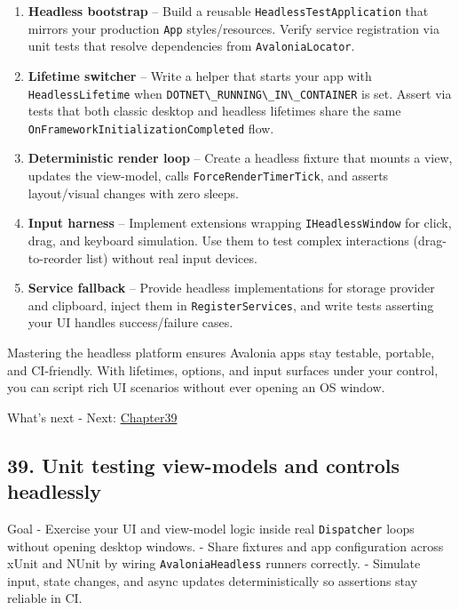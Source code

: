 \begin{enumerate}
\def\labelenumi{\arabic{enumi}.}
\tightlist
\item
  \textbf{Headless bootstrap} -- Build a reusable
  \passthrough{\lstinline!HeadlessTestApplication!} that mirrors your
  production \passthrough{\lstinline!App!} styles/resources. Verify
  service registration via unit tests that resolve dependencies from
  \passthrough{\lstinline!AvaloniaLocator!}.
\item
  \textbf{Lifetime switcher} -- Write a helper that starts your app with
  \passthrough{\lstinline!HeadlessLifetime!} when
  \passthrough{\lstinline!DOTNET\_RUNNING\_IN\_CONTAINER!} is set.
  Assert via tests that both classic desktop and headless lifetimes
  share the same
  \passthrough{\lstinline!OnFrameworkInitializationCompleted!} flow.
\item
  \textbf{Deterministic render loop} -- Create a headless fixture that
  mounts a view, updates the view-model, calls
  \passthrough{\lstinline!ForceRenderTimerTick!}, and asserts
  layout/visual changes with zero sleeps.
\item
  \textbf{Input harness} -- Implement extensions wrapping
  \passthrough{\lstinline!IHeadlessWindow!} for click, drag, and
  keyboard simulation. Use them to test complex interactions
  (drag-to-reorder list) without real input devices.
\item
  \textbf{Service fallback} -- Provide headless implementations for
  storage provider and clipboard, inject them in
  \passthrough{\lstinline!RegisterServices!}, and write tests asserting
  your UI handles success/failure cases.
\end{enumerate}

Mastering the headless platform ensures Avalonia apps stay testable,
portable, and CI-friendly. With lifetimes, options, and input surfaces
under your control, you can script rich UI scenarios without ever
opening an OS window.

What's next - Next: \href{Chapter39.md}{Chapter39}

\newpage

\subsection{39. Unit testing view-models and controls
headlessly}\label{unit-testing-view-models-and-controls-headlessly}

Goal - Exercise your UI and view-model logic inside real
\passthrough{\lstinline!Dispatcher!} loops without opening desktop
windows. - Share fixtures and app configuration across xUnit and NUnit
by wiring \passthrough{\lstinline!AvaloniaHeadless!} runners correctly.
- Simulate input, state changes, and async updates deterministically so
assertions stay reliable in CI.

